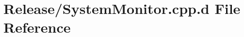 \hypertarget{_release_2_system_monitor_8cpp_8d}{\section{\-Release/\-System\-Monitor.cpp.\-d \-File \-Reference}
\label{_release_2_system_monitor_8cpp_8d}
}

